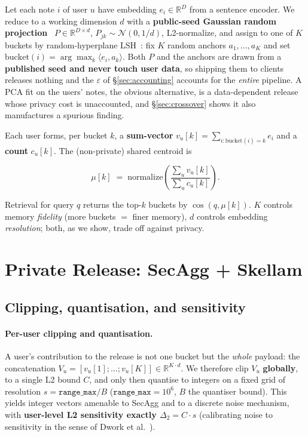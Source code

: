 \documentclass[pdflatex,sn-mathphys-num,12pt]{sn-jnl}
\theoremstyle{thmstyleone}%
\theoremstyle{thmstyletwo}%
\theoremstyle{thmstylethree}%
\newcommand{\eps}{\varepsilon}
\newcommand{\R}{\mathbb{R}}
\newcommand{\secref}[1]{\S\ref{#1}}
\begin{document}
Let each note $i$ of user $u$ have embedding $e_i \in \R^{D}$ from a sentence
encoder. We reduce to a working dimension $d$ with a \textbf{public-seed Gaussian
random projection}~\cite{achlioptas2003rp} $P \in \R^{D \times d}$,
$P_{jk} \sim \mathcal{N}(0, 1/d)$, L2-normalize, and assign to one of $K$ buckets
by random-hyperplane LSH~\cite{charikar2002simhash}: fix $K$
random anchors $a_1, \dots, a_K$ and set
$\mathrm{bucket}(i) = \arg\max_k \langle e_i, a_k \rangle$. Both $P$ and the
anchors are drawn from a \textbf{published seed and never touch user data}, so
shipping them to clients releases nothing and the $\eps$ of
\secref{sec:accounting} accounts for the \emph{entire} pipeline. A PCA fit on the
users' notes, the obvious alternative, is a data-dependent release whose privacy
cost is unaccounted, and \secref{sec:crossover} shows it also manufactures a
spurious finding.

Each user forms, per bucket $k$, a \textbf{sum-vector}
$v_u[k] = \sum_{i : \mathrm{bucket}(i) = k} e_i$ and a \textbf{count} $c_u[k]$.
The (non-private) shared centroid is

\begin{equation}\label{eq:centroid}
  \mu[k] \;=\; \mathrm{normalize}\!\left(
    \frac{\sum_u v_u[k]}{\sum_u c_u[k]}
  \right).
\end{equation}

Retrieval for query $q$ returns the top-$k$ buckets by $\cos(q, \mu[k])$. $K$
controls memory \emph{fidelity} (more buckets $=$ finer memory), $d$ controls
embedding \emph{resolution}; both, as we show, trade off against privacy.

\section{Private Release: SecAgg + Skellam}\label{sec:release}

\subsection{Clipping, quantisation, and sensitivity}\label{sec:clipping}

\paragraph{Per-user clipping and quantisation.} A user's contribution to the
release is not one bucket but the \emph{whole} payload: the concatenation
$V_u = [v_u[1]; \dots; v_u[K]] \in \R^{K \cdot d}$. We therefore clip $V_u$
\textbf{globally}, to a single L2 bound $C$, and only then quantise to integers on
a fixed grid of resolution $s = \texttt{range\_max} / B$
($\texttt{range\_max} = 10^{6}$, $B$ the quantiser bound). This yields integer
vectors amenable to SecAgg and to a discrete noise mechanism, with
\textbf{user-level L2 sensitivity exactly $\Delta_2 = C \cdot s$}
(calibrating noise to sensitivity in the sense of Dwork et
al.~\cite{dwork2006calibrating}).
\end{document}
